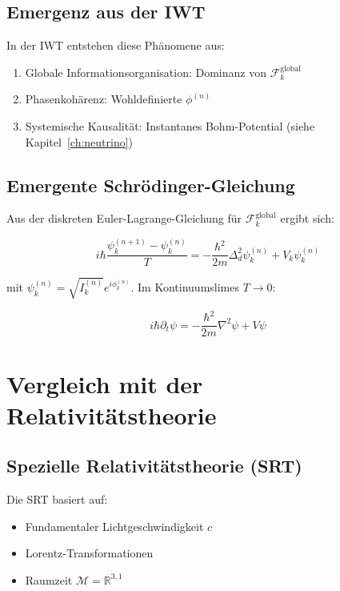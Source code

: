 \subsection{Emergenz aus der IWT}
\label{sub:vergleich_quanten_emergenz}

In der IWT entstehen diese Phänomene aus:

\begin{enumerate}
    \item Globale Informationsorganisation: Dominanz von \( \mathcal{F}_k^{\text{global}} \)
    \item Phasenkohärenz: Wohldefinierte \( \phi^{(n)} \)
    \item Systemische Kausalität: Instantanes Bohm-Potential (siehe Kapitel~\ref{ch:neutrino})
\end{enumerate}

\subsection{Emergente Schrödinger-Gleichung}
\label{sub:vergleich_quanten_schroedinger}

Aus der diskreten Euler-Lagrange-Gleichung für \( \mathcal{F}_k^{\text{global}} \) ergibt sich:

\[
i\hbar \frac{\psi_k^{(n+1)} - \psi_k^{(n)}}{T} = -\frac{\hbar^2}{2m} \Delta_d^2 \psi_k^{(n)} + V_k \psi_k^{(n)}
\]

mit \( \psi_k^{(n)} = \sqrt{I_k^{(n)}} e^{i\phi_k^{(n)}} \). Im Kontinuumslimes \( T \to 0 \):

\[
i\hbar \partial_t \psi = -\frac{\hbar^2}{2m} \nabla^2 \psi + V \psi
\]

\section{Vergleich mit der Relativitätstheorie}
\label{app:vergleich_relativitaet}

\subsection{Spezielle Relativitätstheorie (SRT)}
\label{sub:vergleich_srt}

Die SRT basiert auf:

\begin{itemize}
    \item Fundamentaler Lichtgeschwindigkeit \( c \)
    \item Lorentz-Transformationen
    \item Raumzeit \( \mathcal{M} = \mathbb{R}^{3,1} \)
\end{itemize}


